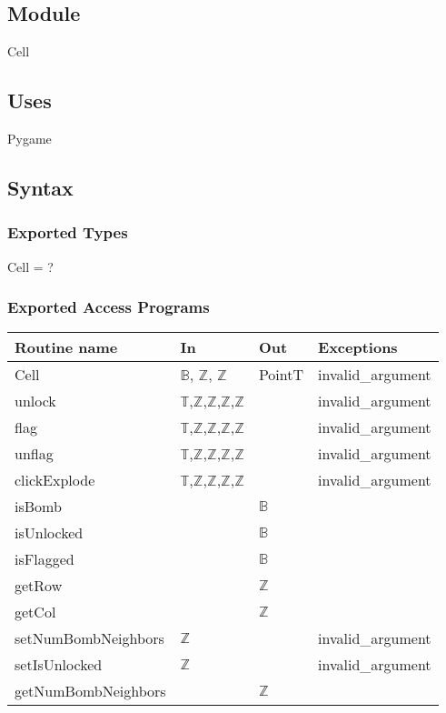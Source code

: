 \documentclass[12pt]{article}
\begin{document}
\subsection{Module}

Cell

\subsection {Uses}

Pygame

\subsection {Syntax}


\subsubsection {Exported Types}

Cell = ?

\subsubsection {Exported Access Programs}

\begin{tabular}{| l | l | l | l |}
\hline
\textbf{Routine name} & \textbf{In} & \textbf{Out} & \textbf{Exceptions}\\
\hline
Cell & $\mathbb{B}$, $\mathbb{Z}$, $\mathbb{Z}$& PointT & invalid\_argument\\
\hline
unlock & $\mathbb{T}$,$\mathbb{Z}$,$\mathbb{Z}$,$\mathbb{Z}$,$\mathbb{Z}$ & ~ & invalid\_argument\\
\hline
flag & $\mathbb{T}$,$\mathbb{Z}$,$\mathbb{Z}$,$\mathbb{Z}$,$\mathbb{Z}$ & ~ & invalid\_argument\\
\hline
unflag & $\mathbb{T}$,$\mathbb{Z}$,$\mathbb{Z}$,$\mathbb{Z}$,$\mathbb{Z}$ & ~ & invalid\_argument\\
\hline
clickExplode & $\mathbb{T}$,$\mathbb{Z}$,$\mathbb{Z}$,$\mathbb{Z}$,$\mathbb{Z}$ & ~ & invalid\_argument\\
\hline
isBomb & ~ & $\mathbb{B}$ & ~\\
\hline
isUnlocked & ~ & $\mathbb{B}$ & ~\\
\hline
isFlagged & ~ & $\mathbb{B}$ & ~\\
\hline
getRow & ~ & $\mathbb{Z}$ & ~\\
\hline
getCol & ~ & $\mathbb{Z}$ & ~\\
\hline
setNumBombNeighbors & $\mathbb{Z}$ & ~ & invalid\_argument\\
\hline
setIsUnlocked & $\mathbb{Z}$ & ~ & invalid\_argument\\
\hline
getNumBombNeighbors & ~ & $\mathbb{Z}$ & ~\\
\hline
\end{tabular}
\end{document}
